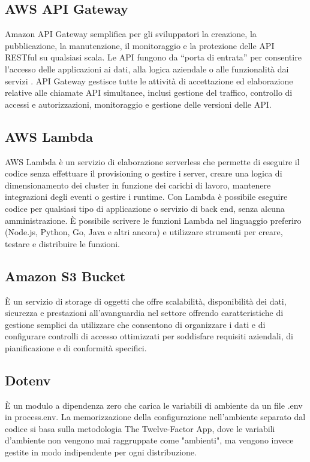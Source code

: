 \subsection{AWS API Gateway}
Amazon API Gateway semplifica per gli sviluppatori la creazione, la pubblicazione, la manutenzione, il monitoraggio e la protezione delle API RESTful su qualsiasi scala. Le API fungono da “porta di entrata” per consentire l’accesso delle applicazioni ai dati, alla logica aziendale o alle funzionalità dai servizi .
API Gateway gestisce tutte le attività di accettazione ed elaborazione relative alle chiamate API simultanee, inclusi gestione del traffico, controllo di accessi e autorizzazioni, monitoraggio e gestione delle versioni delle API.

\subsection{AWS Lambda}
AWS Lambda è un servizio di elaborazione serverless che permette di eseguire il codice senza effettuare il provisioning o gestire i server, creare una logica di dimensionamento dei cluster in funzione dei carichi di lavoro, mantenere integrazioni degli eventi o gestire i runtime.
Con Lambda è possibile eseguire codice per qualsiasi tipo di applicazione o servizio di back end, senza alcuna amministrazione.  È possibile scrivere le funzioni Lambda nel linguaggio preferiro (Node.js, Python, Go, Java e altri ancora) e utilizzare strumenti per creare, testare e distribuire le funzioni.

\subsection{Amazon S3 Bucket}
È un servizio di storage di oggetti che offre scalabilità, disponibilità dei dati, sicurezza e prestazioni all'avanguardia nel settore offrendo caratteristiche di gestione semplici da utilizzare che consentono di organizzare i dati e di configurare controlli di accesso ottimizzati per soddisfare requisiti aziendali, di pianificazione e di conformità specifici.

\subsection{Dotenv}
È un modulo a dipendenza zero che carica le variabili di ambiente da un file .env in process.env. La memorizzazione della configurazione nell'ambiente separato dal codice si basa sulla metodologia The Twelve-Factor App, dove le variabili d'ambiente non vengono mai raggruppate come "ambienti", ma vengono invece gestite in modo indipendente per ogni distribuzione.

